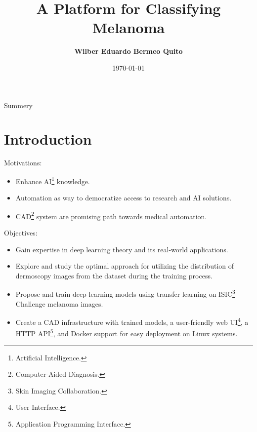 \documentclass[dvipsnames,mathserif]{beamer}
\begin{document}
  \rightskip\rightmargin
  \title{A Platform for Classifying Melanoma}
  \author{ \Large \textbf{Wilber Eduardo Bermeo Quito} }
  \footnotesize{\date{\today }


    \begin{frame}
      \maketitle
    \end{frame}

    \begin{frame}{Summery}
      \footnotesize \tableofcontents
    \end{frame}

    \section{Introduction}

    \begin{frame}
      \large Motivations:
      \vspace{0.25cm}

      \footnotesize
      \begin{itemize}
        \item Enhance AI\footnote{Artificial Intelligence.} knowledge.
        \item Automation as way to democratize access to research and AI solutions.
        \item CAD\footnote{Computer-Aided Diagnosis.} system are promising path
          towards medical automation.
      \end{itemize}
    \end{frame}


    \begin{frame}
      \large Objectives:
      \vspace{0.25cm}

      \footnotesize
      \begin{itemize}
        \item Gain expertise in deep learning theory and its real-world
          applications.
        \item Explore and study the optimal approach for utilizing the distribution
          of dermoscopy images from the dataset during the training process.
        \item Propose and train deep learning models using transfer learning on ISIC\footnote{Skin Imaging Collaboration.}
          Challenge melanoma images.
        \item Create a CAD infrastructure with trained models, a user-friendly
          web UI\footnote{User Interface.}, a HTTP API\footnote{Application
          Programming Interface.}, and Docker support for easy deployment on
          Linux systems.
      \end{itemize}
    \end{frame}

}
\end{document}
